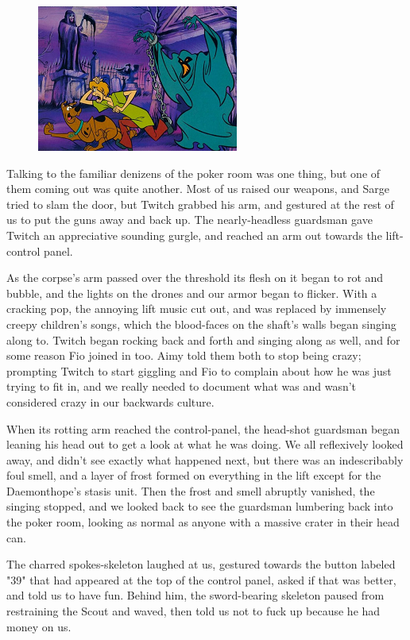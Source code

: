 \begin{figure}
	\begin{center}
		\includegraphics[width=\figwidth]{pics/15/61.png}
	\end{center}
\end{figure}
Talking to the familiar denizens of the poker room was one thing, but one of them coming out was quite another. 
Most of us raised our weapons, and Sarge tried to slam the door, but Twitch grabbed his arm, and gestured at the rest of us to put the guns away and back up. 
The nearly-headless guardsman gave Twitch an appreciative sounding gurgle, and reached an arm out towards the lift-control panel.

As the corpse's arm passed over the threshold its flesh on it began to rot and bubble, and the lights on the drones and our armor began to flicker. 
With a cracking pop, the annoying lift music cut out, and was replaced by immensely creepy children's songs, which the blood-faces on the shaft's walls began singing along to. 
Twitch began rocking back and forth and singing along as well, and for some reason Fio joined in too. 
Aimy told them both to stop being crazy; 
prompting Twitch to start giggling and Fio to complain about how he was just trying to fit in, and we really needed to document what was and wasn't considered crazy in our backwards culture.

When its rotting arm reached the control-panel, the head-shot guardsman began leaning his head out to get a look at what he was doing. 
We all reflexively looked away, and didn't see exactly what happened next, but there was an indescribably foul smell, and a layer of frost formed on everything in the lift except for the Daemonthope's stasis unit. 
Then the frost and smell abruptly vanished, the singing stopped, and we looked back to see the guardsman lumbering back into the poker room, looking as normal as anyone with a massive crater in their head can.

The charred spokes-skeleton laughed at us, gestured towards the button labeled "39" that had appeared at the top of the control panel, asked if that was better, and told us to have fun. 
Behind him, the sword-bearing skeleton paused from restraining the Scout and waved, then told us not to fuck up because he had money on us.


